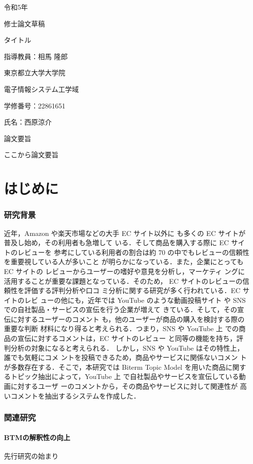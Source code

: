 \documentclass{ltjarticle}
\begin{document}
\begin{titlepage}
    \begin{center}
        {\Large 令和5年}
        \vspace{10truept}

        {\Large 修士論文草稿}
        \vspace*{180truept}

        {\Huge タイトル} 
        \vspace{160truept}

        {\Large 指導教員：相馬 隆郎}
        \vspace{30truept}

        {\Large 東京都立大学大学院}
        \vspace{10truept}

        {\Large 電子情報システム工学域}
        \vspace{30truept}

        {\Large 学修番号：22861651}
        \vspace{10truept}
        
        {\Large 氏名：西原涼介}
    \end{center}
\end{titlepage}
\noindent
{\LARGE 論文要旨}
\vspace{20truept}

ここから論文要旨

\newpage
\tableofcontents
\clearpage

\part{はじめに}
\section{研究背景}
近年，Amazon や楽天市場などの大手 EC サイト以外に
も多くの EC サイトが普及し始め，その利用者も急増して
いる．そして商品を購入する際に EC サイトのレビューを
参考にしている利用者の割合は約 70%
の中でもレビューの信頼性を重要視している人が多いこと
が明らかになっている．また，企業にとっても EC サイトの
レビューからユーザーの嗜好や意見を分析し，マーケティ
ングに活用することが重要な課題となっている．そのため，
EC サイトのレビューの信頼性を評価する評判分析や口コ
ミ分析に関する研究が多く行われている．EC サイトのレビ
ューの他にも，近年では YouTube のような動画投稿サイト
や SNS での自社製品・サービスの宣伝を行う企業が増えて
きている．そして，その宣伝に対するユーザーのコメント
も，他のユーザーが商品の購入を検討する際の重要な判断
材料になり得ると考えられる．つまり，SNS や YouTube 上
での商品の宣伝に対するコメントは，EC サイトのレビュー
と同等の機能を持ち，評判分析の対象になると考えられる．
しかし，SNS や YouTube はその特性上，誰でも気軽にコメ
ントを投稿できるため，商品やサービスに関係ないコメン
トが多数存在する．そこで，本研究では Biterm Topic Model
を用いた商品に関するトピック抽出によって，YouTube 上
で自社製品やサービスを宣伝している動画に対するユーザ
ーのコメントから，その商品やサービスに対して関連性が
高いコメントを抽出するシステムを作成した．

\section{関連研究}
\subsection{BTMの解釈性の向上}
先行研究の始まり
\end{document}
